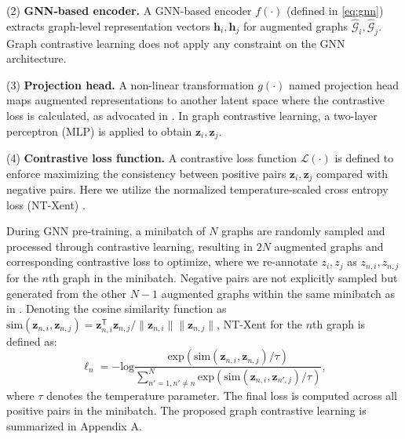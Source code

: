(2) \textbf{GNN-based encoder.}
A GNN-based encoder $f(\cdot)$ (defined in \eqref{eq:gnn}) extracts graph-level representation vectors $\boldsymbol{h}_i, \boldsymbol{h}_j$ for augmented graphs $\hat{\mathcal{G}}_i, \hat{\mathcal{G}}_j$.
Graph contrastive learning does not apply any constraint on the GNN architecture.

(3) \textbf{Projection head.}
A non-linear transformation $g(\cdot)$ named projection head maps augmented representations to another latent space where the contrastive loss is calculated, as advocated in \cite{chen2020simple}.
In graph contrastive learning, a two-layer perceptron (MLP) is applied to obtain $\boldsymbol{z}_i, \boldsymbol{z}_j$.

(4) \textbf{Contrastive loss function.}
A contrastive loss function $\mathcal{L}(\cdot)$ is defined to enforce maximizing the consistency between positive pairs $\boldsymbol{z}_i, \boldsymbol{z}_j$ compared with negative pairs.
Here we utilize the normalized temperature-scaled cross entropy loss (NT-Xent) \cite{sohn2016improved,wu2018unsupervised,oord2018representation}.

During GNN pre-training, a minibatch of $N$ graphs are randomly sampled and processed through contrastive learning, resulting in $2N$ augmented graphs and corresponding contrastive loss to optimize,
where we re-annotate $z_i, z_j$ as $z_{n,i}, z_{n,j}$ for the $n$th graph in the minibatch.
Negative pairs are not explicitly sampled but generated from the other $N-1$ augmented graphs within the same minibatch as in \cite{chen2017sampling,chen2020simple}.
Denoting the cosine similarity function as $\mathrm{sim}(\boldsymbol{z}_{n,i}, \boldsymbol{z}_{n,j}) = \boldsymbol{z}_{n,i}^\mathsf{T} \boldsymbol{z}_{n,j} / \lVert \boldsymbol{z}_{n,i} \rVert \lVert \boldsymbol{z}_{n,j} \rVert$, NT-Xent for the $n$th graph is defined as:
\begin{equation} \label{eq:cl_loss}
    \ell_{n} = -\mathrm{log}\frac{\mathrm{exp}(\mathrm{sim}(\boldsymbol{z}_{n,i}, \boldsymbol{z}_{n,j}) / \tau)}{\sum_{n'=1, n' \neq n}^N \mathrm{exp}(\mathrm{sim}(\boldsymbol{z}_{n,i}, \boldsymbol{z}_{n',j}) / \tau)},
\end{equation}
where $\tau$ denotes the temperature parameter.
The final loss is computed across all positive pairs in the minibatch.
The proposed graph contrastive learning is summarized in Appendix A.  %

